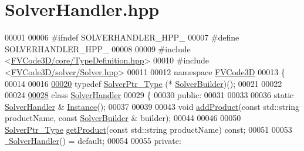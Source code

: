 \hypertarget{SolverHandler_8hpp_source}{}\section{Solver\+Handler.\+hpp}
\label{SolverHandler_8hpp_source}

\begin{DoxyCode}
00001 
00006 \textcolor{preprocessor}{#ifndef SOLVERHANDLER\_HPP\_}
00007 \textcolor{preprocessor}{#define SOLVERHANDLER\_HPP\_}
00008 
00009 \textcolor{preprocessor}{#include <\hyperlink{TypeDefinition_8hpp}{FVCode3D/core/TypeDefinition.hpp}>}
00010 \textcolor{preprocessor}{#include <\hyperlink{Solver_8hpp}{FVCode3D/solver/Solver.hpp}>}
00011 
00012 \textcolor{keyword}{namespace }\hyperlink{namespaceFVCode3D}{FVCode3D}
00013 \{
00014 
00016 
\hypertarget{SolverHandler_8hpp_source.tex_l00020}{}\hyperlink{namespaceFVCode3D_ae1d65e23bd2373e382d1f397337de344}{00020} \textcolor{keyword}{typedef} \hyperlink{namespaceFVCode3D_a0b32227a4e5847c2fb27215fb81d9363}{SolverPtr\_Type} (* \hyperlink{namespaceFVCode3D_ae1d65e23bd2373e382d1f397337de344}{SolverBuilder})();
00021 
00022 
00024 
\hypertarget{SolverHandler_8hpp_source.tex_l00028}{}\hyperlink{classFVCode3D_1_1SolverHandler}{00028} \textcolor{keyword}{class }\hyperlink{classFVCode3D_1_1SolverHandler}{SolverHandler}
00029 \{
00030 \textcolor{keyword}{public}:
00031 
00033 
00036     \textcolor{keyword}{static} \hyperlink{classFVCode3D_1_1SolverHandler}{SolverHandler} & \hyperlink{classFVCode3D_1_1SolverHandler_ada712461029e9fdf623260937afe4da3}{Instance}();
00037 
00039 
00043     \textcolor{keywordtype}{void} \hyperlink{classFVCode3D_1_1SolverHandler_a2d1850e99d392d23fa2a492e0b55ab08}{addProduct}(\textcolor{keyword}{const} std::string productName, \textcolor{keyword}{const} \hyperlink{namespaceFVCode3D_ae1d65e23bd2373e382d1f397337de344}{SolverBuilder} & builder);
00044 
00046 
00050     \hyperlink{namespaceFVCode3D_a0b32227a4e5847c2fb27215fb81d9363}{SolverPtr\_Type} \hyperlink{classFVCode3D_1_1SolverHandler_a15e31d74d5411d2e3eb3ba00140dbeed}{getProduct}(\textcolor{keyword}{const} std::string productName) \textcolor{keyword}{const};
00051 
00053     \hyperlink{classFVCode3D_1_1SolverHandler_af8678d9ce1c7c918e286a986b743e2f3}{~SolverHandler}() = \textcolor{keywordflow}{default};
00054 
00055 \textcolor{keyword}{private}:

\end{DoxyCode}
